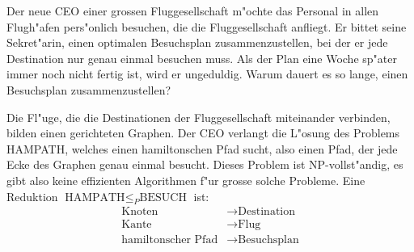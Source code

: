 Der neue CEO einer grossen Fluggesellschaft m"ochte das Personal in allen
Flugh"afen pers"onlich besuchen, die die Fluggesellschaft anfliegt.
Er bittet seine Sekret"arin, einen optimalen Besuchsplan zusammenzustellen,
bei der er jede Destination nur genau einmal besuchen muss.
Als der Plan eine Woche sp"ater immer noch nicht fertig ist, wird er
ungeduldig.
Warum dauert es so lange, einen Besuchsplan zusammenzustellen?

\begin{loesung}
Die Fl"uge, die die Destinationen der Fluggesellschaft miteinander
verbinden, bilden einen gerichteten Graphen.
Der CEO verlangt die L"osung des Problems HAMPATH, welches einen
hamiltonschen Pfad sucht, also einen Pfad, der jede Ecke des Graphen
genau einmal besucht.
Dieses Problem ist NP-vollst"andig, es gibt also keine effizienten
Algorithmen f"ur grosse solche Probleme.
Eine Reduktion $\text{HAMPATH}\le_P\text{BESUCH}$ ist:
\begin{align*}
\text{Knoten}    & \to \text{Destination}\\
\text{Kante}     & \to \text{Flug} \\
\text{hamiltonscher Pfad}&\to\text{Besuchsplan}
\end{align*}
\end{loesung}

